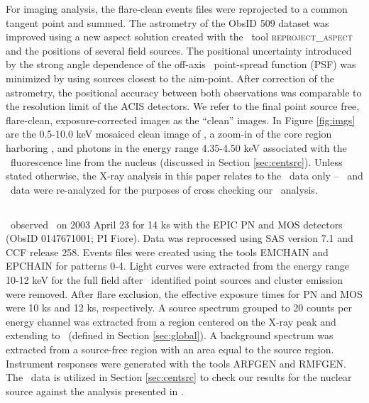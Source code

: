 \documentclass[useAMS,usenatbib]{mn2e}
\begin{document}
For imaging analysis, the flare-clean events files were reprojected to
a common tangent point and summed. The astrometry of the ObsID 509
dataset was improved using a new aspect solution created with the
\ciao\ tool {\textsc{reproject\_aspect}} and the positions of several
field sources. The positional uncertainty introduced by the strong
angle dependence of the off-axis \chandra\ point-spread function (PSF)
was minimized by using sources closest to the aim-point. After
correction of the astrometry, the positional accuracy between both
observations was comparable to the resolution limit of the ACIS
detectors. We refer to the final point source free, flare-clean,
exposure-corrected images as the ``clean'' images. In Figure
\ref{fig:imgs} are the 0.5-10.0 keV mosaiced clean image of \rxj, a
zoom-in of the core region harboring \irs, and photons in the energy
range 4.35-4.50 keV associated with the \feka\ fluorescence line from
the nucleus (discussed in Section \ref{sec:centsrc}). Unless stated
otherwise, the X-ray analysis in this paper relates to the
\chandra\ data only -- \xmm\ and \bepposax\ data were re-analyzed for
the purposes of cross checking our \chandra\ analysis.

\subsection{\xmm}
\label{sec:xmm}

\xmm\ observed \irs\ on 2003 April 23 for 14 ks with the EPIC PN and
MOS detectors (ObsID 0147671001; PI Fiore). Data was reprocessed using
SAS version 7.1 and CCF release 258. Events files were created using
the tools {\textsc{EMCHAIN}} and {\textsc{EPCHAIN}} for patterns
0-4. Light curves were extracted from the energy range 10-12 keV for
the full field after \chandra\ identified point sources and cluster
emission were removed. After flare exclusion, the effective exposure
times for PN and MOS were 10 ks and 12 ks, respectively. A source
spectrum grouped to 20 counts per energy channel was extracted from a
region centered on the X-ray peak and extending to \rf\ (defined in
Section \ref{sec:global}). A background spectrum was extracted from a
source-free region with an area equal to the source region. Instrument
responses were generated with the tools {\textsc{ARFGEN}} and
{\textsc{RMFGEN}}. The \xmm\ data is utilized in Section
\ref{sec:centsrc} to check our results for the nuclear source against
the analysis presented in \citet{2007A&A...473...85P}.
\end{document}
